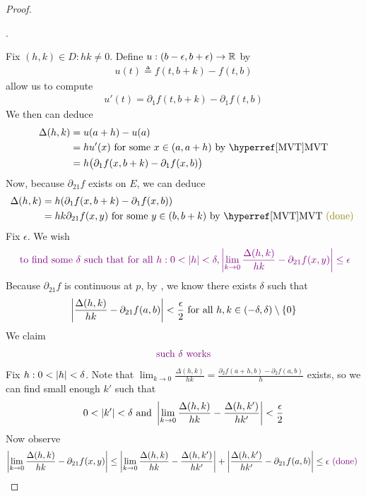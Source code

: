 \documentclass{report}
\begin{document}
\begin{proof}
\begin{center}
   \begin{minipage}{0.9\linewidth}  
     . \label{oea}
   \end{minipage}
\end{center}
Fix $(h,k)\in D: hk\neq 0$. Define $u:(b-\epsilon ,b+\epsilon )\rightarrow \mathbb{R}$ by 
\begin{align*}
u(t)\triangleq f(t,b+k)-f(t,b)
\end{align*}
 allow us to compute   
\begin{align*}
u'(t)=\partial_1 f(t,b+k)-\partial_1 f(t,b)
\end{align*}
We then can deduce
\begin{align*}
\Delta (h,k)&=u(a+h)-u(a)\\
            &=hu'(x)\text{ for some $x\in (a,a+h)$ by \customref{MVT}{MVT}}\\
&=h\big(\partial_1 f(x,b+k)-\partial_1 f(x,b) \big)
\end{align*}
Now, because $\partial_{21}f$ exists on $E$, we can deduce
\begin{align*}
\Delta (h,k)&=h(\partial_1 f(x,b+k)-\partial_1 f(x,b))\\
&=hk\partial_{21}f(x,y)\text{ for some $y\in (b,b+k)$ by \customref{MVT}{MVT}}\odone
\end{align*}
Fix $\epsilon $. We wish 
\begin{align*}
  \textcolor{violet}{\text{ to find some $\delta$ such that for all }h:0<\left|h\right|<\delta, \left|\lim_{k\to 0}\frac{\Delta (h,k)}{hk}-\partial_{21}f(x,y)\right|\leq \epsilon }
\end{align*}
Because $\partial_{21}f$ is continuous at $p$, by , we know there exists $\delta$ such that  
\begin{align*}
  \left|\frac{\Delta ( h,k)}{hk}-\partial_{21}f(a,b)\right|<\frac{\epsilon }{2}\text{ for all }h,k \in (-\delta,\delta)\setminus \{ 0 \}
\end{align*}
We claim 
\begin{align*}
\textcolor{violet}{\text{ such }\delta\text{ works }}
\end{align*}
Fix $h:0<\left|h\right|<\delta$. Note that $\lim_{k\to 0}\frac{\Delta (h,k)}{hk}=\frac{\partial_2 f(a+h,b)-\partial_2 f(a,b)}{h}$ exists, so we can find small enough $k'$ such that
\begin{align*}
  0<\left|k'\right|<\delta \text{ and } \left|\lim_{k\to 0} \frac{\Delta (h,k)}{hk}- \frac{\Delta (h,k')}{hk'}\right|<\frac{\epsilon}{2}
\end{align*}
Now observe 
\begin{align*}
\left|\lim_{k\to 0}\frac{\Delta (h,k)}{hk}-\partial_{21}f(x,y)\right|\leq \left|\lim_{k\to 0}\frac{\Delta (h,k)}{hk}-\frac{\Delta (h,k')}{hk'}\right|+ \left|\frac{\Delta (h,k')}{hk'}-\partial_{21}f(a,b)\right|\leq \epsilon \textcolor{violet}{\text{ (done) }}
\end{align*}





\end{proof}
\end{document}
